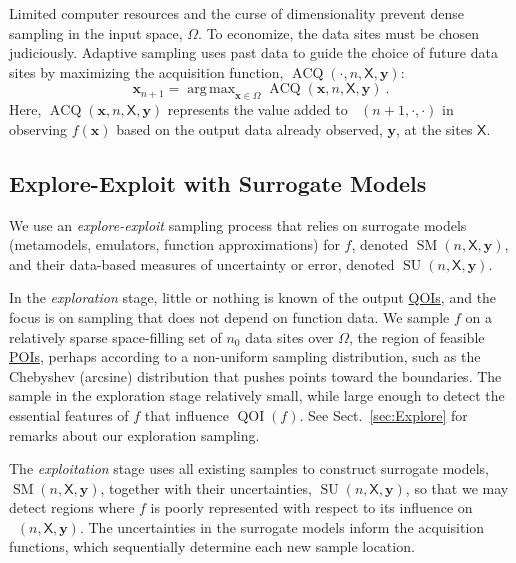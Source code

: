 \documentclass[11pt]{NSFamsart}
\newcommand{\QOIs}{\hyperlink{QOIlink}{QOIs}\xspace}
\newcommand{\POIs}{\hyperlink{POIlink}{POIs}\xspace}
\DeclareMathOperator{\QOI}{QOI} %
\DeclareMathOperator*{\argmax}{arg\,max}
\DeclareMathOperator{\APP}{\widehat{\QOI}}
\DeclareMathOperator{\SURR}{SM} %
\DeclareMathOperator{\VAL}{ACQ}
\DeclareMathOperator{\SURRERR}{SU}
\newcommand{\mX}{\mathsf{X}}
\newcommand{\bx}{{\boldsymbol{x}}}
\newcommand{\by}{{\boldsymbol{y}}}
\begin{document}
Limited computer resources and the curse of dimensionality prevent dense sampling in the input space, $\Omega$. To economize, the data sites must be chosen judiciously. Adaptive sampling uses past data to guide the choice of future data sites by maximizing the acquisition function, $\VAL(\cdot,n,\mX, \by)$: 
\begin{equation} \label{eq:nextsample}
\bx_{n+1} = \argmax_{\bx \in \Omega} \VAL(\bx,n,\mX, \by)~.
\end{equation}
Here, $\VAL(\bx,n,\mX, \by)$ represents the value added to $\APP(n+1,\cdot,\cdot)$ in observing $f(\bx)$ based on the output data already observed, $\by$, at the sites $\mX$. 

\subsection{Explore-Exploit with Surrogate Models} We use an \emph{explore-exploit} sampling process that relies on surrogate models (metamodels, emulators, function approximations) for $f$, denoted $\SURR(n,\mX,\by)$, and their data-based measures of uncertainty or error, denoted $\SURRERR(n,\mX,\by)$. 

In the \emph{exploration} stage, little or nothing is known of the output \QOIs, and the focus is on sampling that does not depend on function data. We sample $f$ on a relatively sparse space-filling set of $n_0$ data sites over $\Omega$, the region of feasible \POIs, perhaps according to a non-uniform sampling distribution, such as the Chebyshev (arcsine) distribution that pushes points toward the boundaries. The sample in the exploration stage relatively small, while large enough to detect the essential features of $f$ that influence $\QOI(f)$.  See Sect.\ \ref{sec:Explore} for remarks about our exploration sampling.

The \emph{exploitation} stage uses all existing samples to construct surrogate models, $\SURR(n,\mX,\by)$, together with their uncertainties, $\SURRERR(n,\mX,\by)$, so that we may detect regions where $f$ is poorly represented with respect to its influence on $\APP(n,\mX,\by)$. The uncertainties in the surrogate models inform the acquisition functions, which sequentially determine each new sample location.
\end{document}
